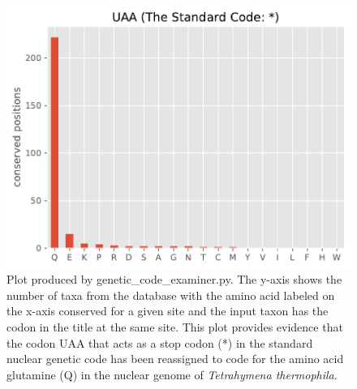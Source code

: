 \documentclass{article}
\begin{document}
        \begin{figure}[H]
        \centering
        \includegraphics[width=\linewidth]{figures/tetrahymena.fasta_genecode.pdf}
        \caption{Plot produced by genetic\_code\_examiner.py. The y-axis shows the number of taxa from the database with the amino acid labeled on the x-axis conserved for a given site and the input taxon has the codon in the title at the same site. This plot provides evidence that the codon UAA that acts as a stop codon (*) in the standard nuclear genetic code has been reassigned to code for the amino acid glutamine (Q) in the nuclear genome of \textit{Tetrahymena thermophila}.}
        \label{Fig:agencode}
        \end{figure}
        
        \pagebreak
                     
        \vspace{0.5cm}
        
\end{document}
